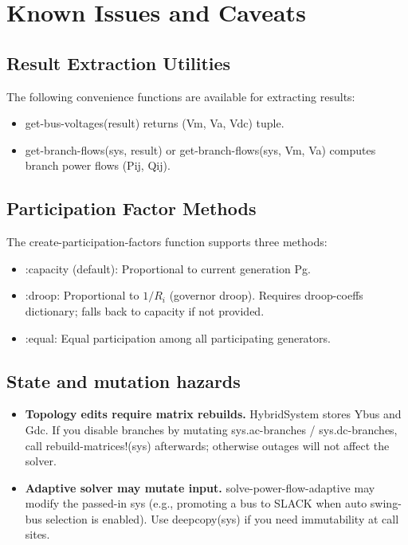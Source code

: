 \documentclass[11pt]{article}
\def\code#1{#1}%
\def\_{-}%
\newcommand{\code}[1]{\nolinkurl{#1}}
\begin{document}
\section{Known Issues and Caveats}\label{sec:code-review}

\subsection{Result Extraction Utilities}
The following convenience functions are available for extracting results:
\begin{itemize}[leftmargin=*]
  \item \code{get\_bus\_voltages(result)} returns \code{(Vm, Va, Vdc)} tuple.
  \item \code{get\_branch\_flows(sys, result)} or \code{get\_branch\_flows(sys, Vm, Va)} computes branch power flows \code{(Pij, Qij)}.
\end{itemize}

\subsection{Participation Factor Methods}
The \code{create\_participation\_factors} function supports three methods:
\begin{itemize}[leftmargin=*]
  \item \code{:capacity} (default): Proportional to current generation \code{Pg}.
  \item \code{:droop}: Proportional to $1/R_i$ (governor droop). Requires \code{droop\_coeffs} dictionary; falls back to capacity if not provided.
  \item \code{:equal}: Equal participation among all participating generators.
\end{itemize}

\subsection{State and mutation hazards}
\begin{itemize}[leftmargin=*]
  \item \textbf{Topology edits require matrix rebuilds.} \code{HybridSystem} stores \code{Ybus} and \code{Gdc}. If you disable branches by mutating \code{sys.ac\_branches} / \code{sys.dc\_branches}, call \code{rebuild\_matrices!(sys)} afterwards; otherwise outages will not affect the solver.
  \item \textbf{Adaptive solver may mutate input.} \code{solve\_power\_flow\_adaptive} may modify the passed-in \code{sys} (e.g., promoting a bus to \code{SLACK} when auto swing-bus selection is enabled). Use \code{deepcopy(sys)} if you need immutability at call sites.
\end{itemize}
\end{document}
